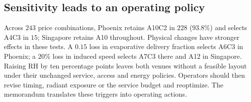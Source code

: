 \subsection{Sensitivity leads to an operating policy}
Across $243$ price combinations, Phoenix retains A10C2 in $228$ ($93.8\%$) and selects A4C3 in $15$; Singapore retains A10 throughout. Physical changes have stronger effects in these tests. A $0.15$ loss in evaporative delivery fraction selects A6C3 in Phoenix; a $20\%$ loss in induced speed selects A7C3 there and A12 in Singapore. Raising RH by ten percentage points leaves both venues without a feasible layout under their unchanged service, access and energy policies. Operators should then revise timing, radiant exposure or the service budget and reoptimize. The memorandum translates these triggers into operating actions.
